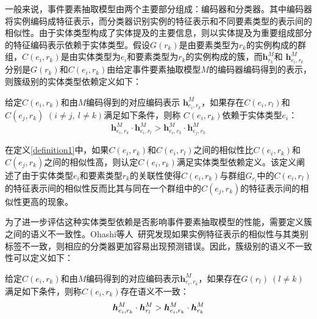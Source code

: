 一般来说，事件要素抽取模型由两个主要部分组成：编码器和分类器。其中编码器将实例编码成特征表示，而分类器识别实例的特征表示和不同要素类型的表示间的相似性。由于实体类型构成了实体提及的主要信息，则以实体提及为重要组成部分的特征编码表示依赖于实体类型。假设$G(r_{k})$是由要素类型为$r_{k}$的实例构成的群组，$C(e_{i}, r_{k})$是由实体类型为$e_{i}$和要素类型为$r_{k}$的实例构成的簇，而$\boldsymbol{h}_{ r_{k}}^{M}$和 $\boldsymbol{h}_{e_{i}, r_{k}}^{M}$分别是$G(r_{k})$和$C(e_{i}, r_{k})$由给定事件要素抽取模型$M$的编码器编码得到的表示，则簇级别的实体类型依赖定义如下：
\begin{definition}[实体类型依赖]
\label{definition1}
给定$C(e_{i}, r_{k})$和由$M$编码得到的对应编码表示 $\boldsymbol{h}_{e_{i}, r_{k}}^{M}$，如果存在$C(e_{i}, r_{l})$和$C(e_{j}, r_{k})$ $(i \neq j,\ l \neq k)$满足如下条件，则称
$C(e_{i}, r_{k})$依赖于实体类型$e_{i}$： 
\begin{equation}
\label{equation1}
  \boldsymbol{h}_{e_{i},r_{k}}^{M} \cdot \boldsymbol{h}_{e_{i},r_{l}}^{M} > \boldsymbol{h}_{e_{i},r_{k}}^{M} \cdot \boldsymbol{h}_{e_{j},r_{k}}^{M} 
\end{equation}
\end{definition}
在定义\ref{definition1}中，如果$C(e_{i}, r_{k})$和$C(e_{i}, r_{l})$之间的相似性比$C(e_{i}, r_{k})$和$C(e_{j}, r_{k})$之间的相似性高，则认定$C(e_{i}, r_{k})$满足实体类型依赖定义。该定义阐述了由于实体类型$e_{i}$和要素类型$r_{k}$的关联性使得$C(e_{i}, r_{k})$与群组$G_{r_{l}}$中的$C(e_{i}, r_{l})$的特征表示间的相似性反而比其与同在一个群组中的$C(e_{j}, r_{k})$的特征表示间的相似性更高的现象。

为了进一步评估这种实体类型依赖是否影响事件要素抽取模型的性能，需要定义簇之间的语义不一致性。Ohashi等人~\cite{ohashi2020text}研究发现如果实例特征表示的相似性与其类别标签不一致，则相应的分类器更加容易出现预测错误。因此，簇级别的语义不一致性可以定义如下：
\begin{definition}[语义不一致]
\label{definition2}
给定$C(e_{i}, r_{k})$和由$M$编码得到的对应编码表示$\boldsymbol{h}_{e_{i}, r_{k}}^{M}$，如果存在$G(r_{l})\ (l \neq k) $满足如下条件，则称$C(e_{i}, r_{k})$存在语义不一致：
\begin{equation}
\label{equation2}
     \boldsymbol{h}_{e_{i},r_{k}}^{M} \cdot  \boldsymbol{h}_{r_{l}}^{M} > \boldsymbol{h}_{e_{i},r_{k}}^{M} \cdot \boldsymbol{h}_{r_{k}}^{M} \\
\end{equation}
\end{definition}


